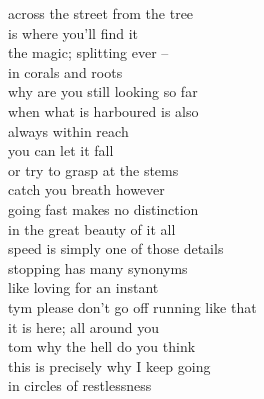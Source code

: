 across the street from the tree\\
is where you'll find it\\
the magic; splitting ever --\\
in corals and roots\\
why are you still looking so far\\
when what is harboured is also\\
always within reach\\

you can let it fall\\
or try to grasp at the stems\\
catch you breath however\\
going fast makes no distinction\\
in the great beauty of it all\\
speed is simply one of those details\\

stopping has many synonyms\\
like loving for an instant\\
tym please don't go off running like that\\
it is here; all around you\\
tom why the hell do you think\\
this is precisely why I keep going\\
in circles of restlessness
